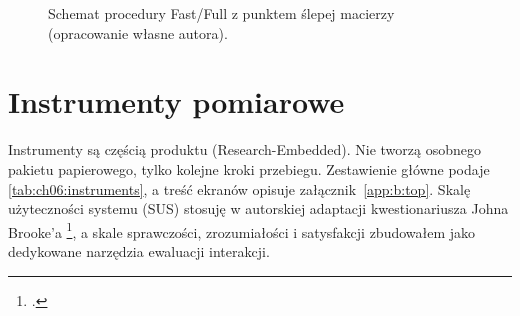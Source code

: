 \begin{figure}[htbp]
  \centering
  \caption{Schemat procedury Fast/Full z punktem ślepej macierzy (opracowanie własne autora).
  }
  \label{fig:ch06:procedure}
\end{figure}

\section{Instrumenty pomiarowe}
\label{ch06:sec:instrumenty}

Instrumenty są częścią produktu (Research-Embedded). Nie tworzą osobnego pakietu papierowego, tylko kolejne kroki przebiegu. Zestawienie główne podaje \cref{tab:ch06:instruments}, a treść ekranów opisuje załącznik~\ref{app:b:top}.
Skalę użyteczności systemu (SUS) stosuję w autorskiej adaptacji kwestionariusza Johna Brooke'a \footcite{brooke1996sus}, a skale sprawczości, zrozumiałości i satysfakcji zbudowałem jako dedykowane narzędzia ewaluacji interakcji.

